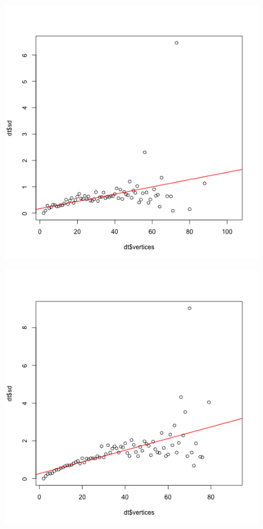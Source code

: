 \documentclass[paper=a4, fontsize=11pt]{scrartcl} %
\begin{document}
\begin{figure}
\centering
\begin{minipage}{.5\textwidth}
  \centering
  \includegraphics[width=\linewidth]{homoscedasticity_Greek.png}
  \label{fig:17}
\end{minipage}%
\begin{minipage}{.5\textwidth}
  \centering
  \includegraphics[width=\linewidth]{homoscedasticity_Hungarian.png}
  \label{fig:18}
\end{minipage}
\end{figure}
\end{document}
